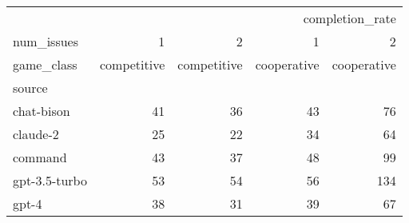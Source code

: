\begin{tabular}{lrrrr}
\toprule
 & \multicolumn{4}{r}{completion_rate} \\
num_issues & 1 & 2 & 1 & 2 \\
game_class & competitive & competitive & cooperative & cooperative \\
source &  &  &  &  \\
\midrule
chat-bison & 41 & 36 & 43 & 76 \\
claude-2 & 25 & 22 & 34 & 64 \\
command & 43 & 37 & 48 & 99 \\
gpt-3.5-turbo & 53 & 54 & 56 & 134 \\
gpt-4 & 38 & 31 & 39 & 67 \\
\bottomrule
\end{tabular}

